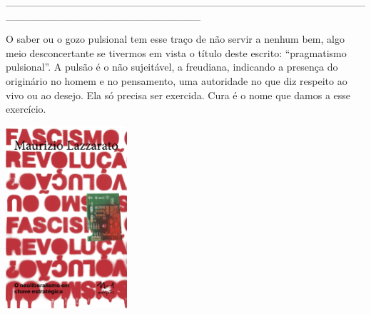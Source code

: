 \hspace*{-2cm}\_\_\_\_\_\_\_\_\_\_\_\_\_\_\_\_\_\_\_\_\_\_\_\_\_\_\_\_\_\_\_\_\_\_\_\_\_\_\_\_\_\_\_\_\_\_\_\_\_\_\_\_\_\_\_\_\_\_\_\_\_\_\_\_\_\_\_\_\_\_\_\_\_\_

\medskip

\noindent{}O saber ou o gozo pulsional tem esse traço de não servir a nenhum bem, algo meio desconcertante se tivermos em vista o título deste escrito: “pragmatismo pulsional”. A pulsão é o não sujeitável, a {} freudiana, indicando a presença do originário no homem e no pensamento, uma autoridade no que diz respeito ao vivo ou ao desejo. Ela só precisa ser exercida. Cura é o nome que damos a esse exercício.

\vfill

\hspace*{-.4cm}\begin{minipage}[c]{0.90\linewidth}
\small{
{}}
\end{minipage}

\pagebreak

\hspace{.5cm}

\begin{center}
\hspace*{-2.5cm}
\hspace*{2cm}\includegraphics[width=45mm]{./imgs/lazzarato.jpg}
\end{center}

